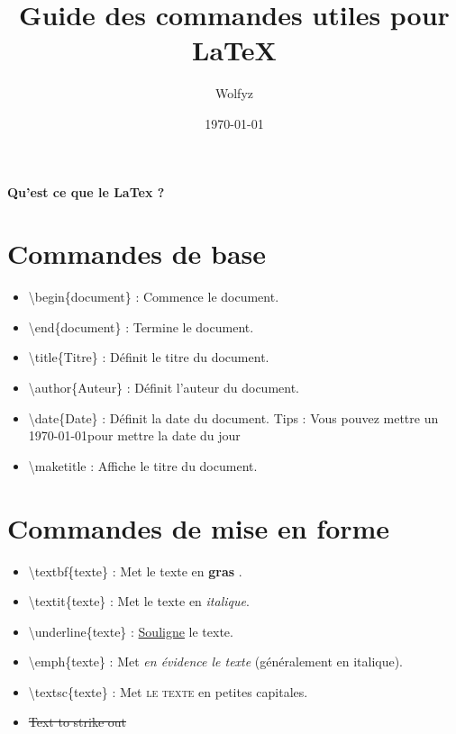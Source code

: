 \documentclass{article}
\title{Guide des commandes utiles pour LaTeX}
\author{Wolfyz}
\date{\today}
\begin{document}
\maketitle

\paragraph{Qu'est ce que le LaTex ? }

\section{Commandes de base}
\begin{itemize}
\item \textbackslash{}begin\{document\} : Commence le document.
\item \textbackslash{}end\{document\} : Termine le document.
\item \textbackslash{}title\{Titre\} : Définit le titre du document.
\item \textbackslash{}author\{Auteur\} : Définit l'auteur du document.
\item \textbackslash{}date\{Date\} : Définit la date du document.
Tips :  Vous pouvez mettre un \today pour mettre la date du jour 
\item \textbackslash{}maketitle : Affiche le titre du document.
\end{itemize}


\section{Commandes de mise en forme}
\begin{itemize}
\item \textbackslash{}textbf\{texte\} : Met le texte en \textbf{gras} .
\item \textbackslash{}textit\{texte\} : Met le texte en \textit{italique}.
\item \textbackslash{}underline\{texte\} : \underline{Souligne} le texte.
\item \textbackslash{}emph\{texte\} : Met \emph{en évidence le texte} (généralement en italique).
\item \textbackslash{}textsc\{texte\} : Met \textsc{le texte} en petites capitales.
\item \sout{Text to strike out}
\end{itemize}
\end{document}
